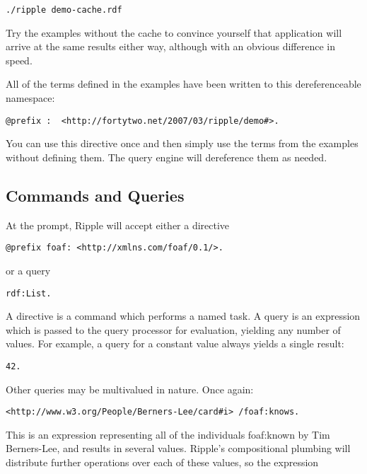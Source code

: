 \documentclass[runningheads]{llncs}
\begin{document}
\begin{verbatim}
./ripple demo-cache.rdf
\end{verbatim}

Try the examples without the cache to convince yourself that application will arrive at the same results either way, although with an obvious difference in speed.

All of the terms defined in the examples have been written to this dereferenceable namespace:

\begin{verbatim}
@prefix :  <http://fortytwo.net/2007/03/ripple/demo#>.
\end{verbatim}

You can use this directive once and then simply use the terms from the examples without defining them.  The query engine will dereference them as needed.


\subsection{Commands and Queries}


At the prompt, Ripple will accept either a directive

\begin{verbatim}
@prefix foaf: <http://xmlns.com/foaf/0.1/>.
\end{verbatim}

or a query

\begin{verbatim}
rdf:List.
\end{verbatim}

A directive is a command which performs a named task.  A query is an expression which is passed to the query processor for evaluation, yielding any number of values.  For example, a query for a constant value always yields a single result:

\begin{verbatim}
42.
\end{verbatim}

Other queries may be multivalued in nature.  Once again:

\begin{verbatim}
<http://www.w3.org/People/Berners-Lee/card#i> /foaf:knows.
\end{verbatim}

This is an expression representing all of the individuals foaf:known by Tim
Berners-Lee, and results in several values.  Ripple's compositional plumbing
will distribute further operations over each of these values, so the expression
\end{document}
